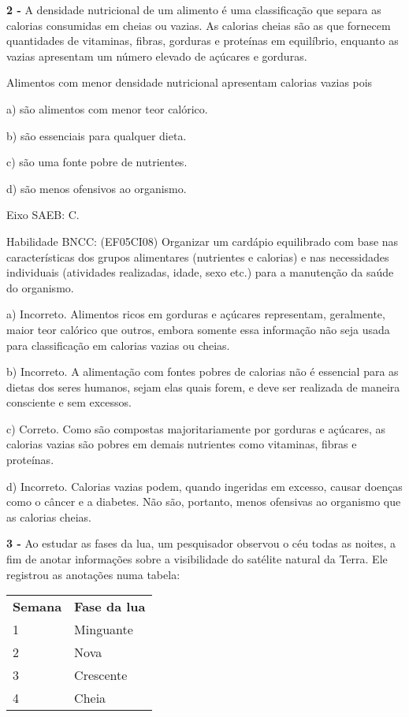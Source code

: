 \textbf{2 -} A densidade nutricional de um alimento é uma classificação
que separa as calorias consumidas em cheias ou vazias. As calorias
cheias são as que fornecem quantidades de vitaminas, fibras, gorduras e
proteínas em equilíbrio, enquanto as vazias apresentam um número elevado
de açúcares e gorduras.

Alimentos com menor densidade nutricional apresentam calorias vazias
pois

a) são alimentos com menor teor calórico.

b) são essenciais para qualquer dieta.

c) são uma fonte pobre de nutrientes.

d) são menos ofensivos ao organismo.

Eixo SAEB: C.

Habilidade BNCC: (EF05CI08) Organizar um cardápio equilibrado com base
nas características dos grupos alimentares (nutrientes e calorias) e nas
necessidades individuais (atividades realizadas, idade, sexo etc.) para
a manutenção da saúde do organismo.

a) Incorreto. Alimentos ricos em gorduras e açúcares representam,
geralmente, maior teor calórico que outros, embora somente essa
informação não seja usada para classificação em calorias vazias ou
cheias.

b) Incorreto. A alimentação com fontes pobres de calorias não é
essencial para as dietas dos seres humanos, sejam elas quais forem, e
deve ser realizada de maneira consciente e sem excessos.

c) Correto. Como são compostas majoritariamente por gorduras e açúcares,
as calorias vazias são pobres em demais nutrientes como vitaminas,
fibras e proteínas.

d) Incorreto. Calorias vazias podem, quando ingeridas em excesso, causar
doenças como o câncer e a diabetes. Não são, portanto, menos ofensivas
ao organismo que as calorias cheias.

\textbf{3 -} Ao estudar as fases da lua, um pesquisador observou o céu
todas as noites, a fim de anotar informações sobre a visibilidade do
satélite natural da Terra. Ele registrou as anotações numa tabela:

\begin{longtable}[]{@{}ll@{}}
\toprule
\textbf{Semana} & \textbf{Fase da lua}\tabularnewline
1 & Minguante\tabularnewline
2 & Nova\tabularnewline
3 & Crescente\tabularnewline
4 & Cheia\tabularnewline
\bottomrule
\end{longtable}

